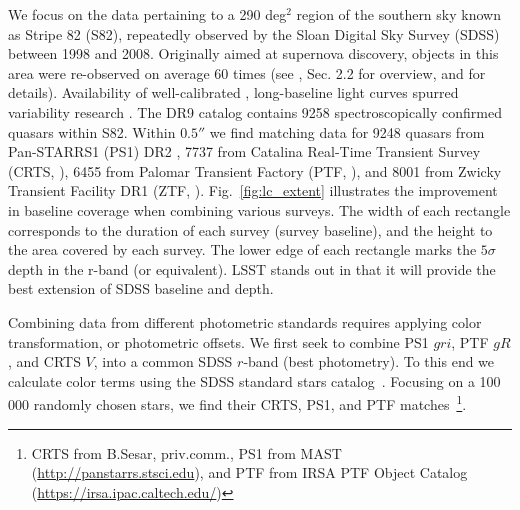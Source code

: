\documentclass[twocolumn]{aastex62}
\begin{document}
We focus on the data pertaining to a 290 deg$^{2}$ region of the southern sky known as Stripe 82 (S82), repeatedly observed by the Sloan Digital Sky Survey (SDSS) between 1998 and 2008. Originally aimed at supernova discovery, objects in this area were re-observed on average 60 times (see \citealt{macleod2012}, Sec. 2.2 for overview, and \citealt{annis2014} for details). Availability of well-calibrated \citep{ivezic2007}, long-baseline light curves spurred variability research \citep{sesar2007}. The DR9 catalog \citep{schneider2008} contains 9258 spectroscopically confirmed quasars within S82. Within  $0.5 ''$  we find matching data for 9248 quasars from  Pan-STARRS1 (PS1) DR2 \citep{chambers2016,flewelling2016,flewelling2018}, 7737 from Catalina Real-Time Transient Survey (CRTS, \citealt{drake2009}),  6455 from Palomar Transient Factory (PTF, \citealt{rau2009}), and 8001 from Zwicky Transient Facility DR1 (ZTF, \citealt{bellm2019,masci2019}). Fig.~\ref{fig:lc_extent} illustrates the improvement in baseline coverage when combining various surveys. The width of each rectangle corresponds to the duration of each survey (survey baseline), and the height to the area covered by each survey. The lower edge of each rectangle marks the $5\sigma$ depth in the r-band (or equivalent). LSST stands out in that it will provide the best extension of SDSS baseline and depth.  


\begin{figure*} 
	\caption{An illustration of survey baseline, sky area covered, and depth. The width of each rectangle corresponds to the extent of real or simulated light curves for Stripe 82 quasars for each survey. This includes SDSS DR7, CRTS DR2, PS1 DR2, PTF DR2, ZTF DR1, and for LSST the full 10-year survey. The lower edge of each rectangle (marked by a  thick dashed line) corresponds to the $5\sigma$ limiting magnitude (SDSS $r$, PS1 $r$, PTF $R$, ZTF $r$, LSST $r$, CRTS $V$). The vertical extent of each rectangle corresponds to the total survey area (for SDSS, up to DR15).  Note how PS1 and PTF extend the baseline of SDSS by approximately $50\%$, and how inclusion of LSST roughly triples the SDSS baseline. For reference, the area covered by LSST is $20 000$ sq.deg.}
	\label{fig:lc_extent}
\end{figure*} 


Combining data from different photometric standards requires applying color transformation, or photometric offsets. We first seek to combine PS1 $gri$,  PTF $gR$, and CRTS $V$, into a common SDSS $r$-band (best photometry). To this end we calculate  color terms using the SDSS standard stars catalog~\citep{ivezic2007}. Focusing on a 100 000 randomly chosen stars, we find their CRTS, PS1, and PTF matches~\footnote{CRTS from B.Sesar, priv.comm., PS1 from MAST (\url{http://panstarrs.stsci.edu}), and PTF from IRSA PTF Object Catalog (\url{https://irsa.ipac.caltech.edu/})}. 
\end{document}
